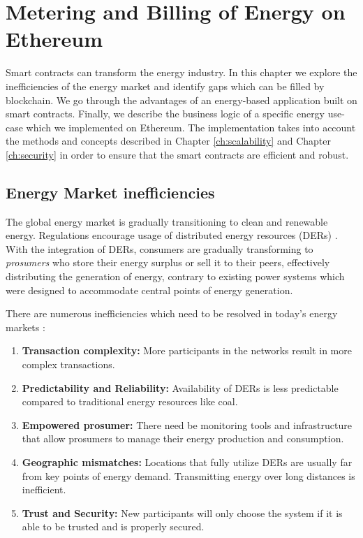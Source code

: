\chapter{Metering and Billing of Energy on Ethereum}\label{ch:implementation}

Smart contracts can transform the energy industry. In this chapter we explore the inefficiencies of the energy market and identify gaps which can be filled by blockchain. We go through the advantages of an energy-based application built on smart contracts. Finally, we describe the business logic of a specific energy use-case which we implemented on Ethereum. The implementation takes into account the methods and concepts described in Chapter \ref{ch:scalability} and Chapter \ref{ch:security} in order to ensure that the smart contracts are efficient and robust.


\section{Energy Market inefficiencies}

The global energy market is gradually transitioning to clean and renewable energy. Regulations encourage usage of distributed energy resources (DERs) \cite{europe2030}. With the integration of DERs, consumers are gradually transforming to \textit{prosumers} who store their energy surplus or sell it to their peers, effectively distributing the generation of energy, contrary to existing power systems which were designed to accommodate central points of energy generation.

There are numerous inefficiencies which need to be resolved in today's energy markets \cite{ey-inefficiencies}:
\begin{enumerate}
    \item \textbf{Transaction complexity:} More participants in the networks result in more complex transactions.
    \item \textbf{Predictability and Reliability:} Availability of DERs is less predictable compared to traditional energy resources like coal. 
    \item \textbf{Empowered prosumer:} There need be monitoring tools and infrastructure that allow prosumers to manage their energy production and consumption.
    \item \textbf{Geographic mismatches:} Locations that fully utilize DERs are usually far from key points of energy demand. Transmitting energy over long distances is inefficient.
    \item \textbf{Trust and Security:} New participants will only choose the system if it is able to be trusted and is properly secured.
\end{enumerate}

